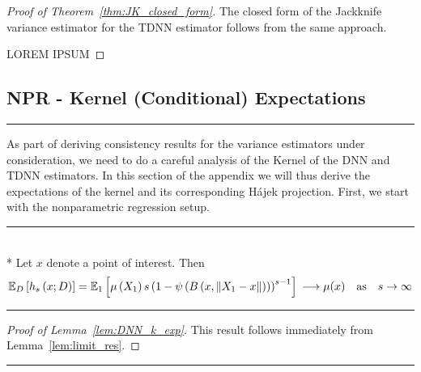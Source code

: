 \begin{proof}[Proof of Theorem~\ref{thm:JK_closed_form}]
	The closed form of the Jackknife variance estimator for the TDNN estimator follows from the same approach.

		{\color{red} LOREM IPSUM}
\end{proof}

\newpage
\subsection{NPR - Kernel (Conditional) Expectations}\label{subsec:KernelCondExp}
\hrule
As part of deriving consistency results for the variance estimators under consideration, we need to do a careful analysis of the Kernel of the DNN and TDNN estimators.
In this section of the appendix we will thus derive the expectations of the kernel and its corresponding H\'ajek projection.
First, we start with the nonparametric regression setup.
\vspace{0.5cm}
\hrule

\begin{lem}\label{lem:DNN_k_exp}\mbox{}\\*
	Let $x$ denote a point of interest.
	Then
	\begin{equation}
		\mathbb{E}_D\left[h_s\left(x; D\right)\right]
		= \mathbb{E}_{1}\left[\mu\left(X_1\right) s\left(1 - \psi\left(B\left(x, \|X_1 - x\|\right)\right)\right)^{s-1}\right]\\
		\longrightarrow \mu(x) \quad \text{as} \quad s \rightarrow \infty
	\end{equation}
\end{lem}
\hrule
\begin{proof}[Proof of Lemma~\ref{lem:DNN_k_exp}]
	This result follows immediately from Lemma~\ref{lem:limit_res}.
\end{proof}

\hrule

